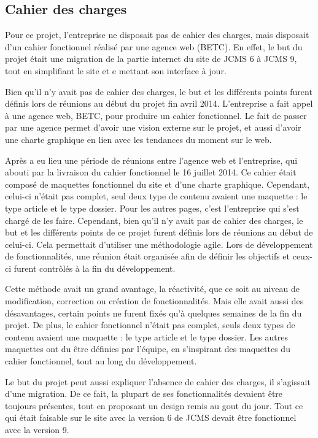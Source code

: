 \documentclass[12pt,a4paper]{article}
\begin{document}
\newpage
\subsection{Cahier des charges}
Pour ce projet, l'entreprise ne disposait pas de cahier des charges, mais disposait d'un cahier fonctionnel réalisé par une agence web (BETC). En effet, le but du projet était une migration de la partie internet du site de \gls{JCMS} 6 à \gls{JCMS} 9, tout en simplifiant le site et e mettant son interface à jour.\par
Bien qu'il n'y avait pas de cahier des charges, le but et les différents points furent définis lors de réunions au début du projet fin avril 2014. L'entreprise a fait appel à une agence web, BETC, pour produire un cahier fonctionnel. Le fait de passer par une agence permet d'avoir une vision externe sur le projet, et aussi d'avoir une charte graphique en lien avec les tendances du moment sur le web.\par 
Après a eu lieu une période de réunions entre l'agence web et l'entreprise, qui abouti par la livraison du cahier fonctionnel le 16 juillet 2014. Ce cahier était composé de maquettes fonctionnel du site et d'une charte graphique. Cependant, celui-ci n'était pas complet, seul deux type de contenu avaient une maquette : le type article et le type dossier. Pour les autres pages, c'est l'entreprise qui s'est chargé de les faire.
Cependant, bien qu'il n'y avait pas de cahier des charges, le but et les différents points de ce projet furent définis lors de réunions au début de celui-ci. Cela permettait d'utiliser une méthodologie agile. Lors de développement de fonctionnalités, une réunion était organisée afin de définir les objectifs et ceux-ci furent contrôlés à la fin du développement.\par 
Cette méthode avait un grand avantage, la réactivité, que ce soit au niveau de modification, correction ou création de fonctionnalités. Mais elle avait aussi des désavantages, certain points ne furent fixés qu'à quelques semaines de la fin du projet. De plus, le cahier fonctionnel n'était pas complet, seuls deux types de contenu avaient une maquette : le type article et le type dossier. Les autres maquettes ont du être définies par l'équipe, en s'inspirant des maquettes du cahier fonctionnel, tout au long du développement. \par 
Le but du projet peut aussi expliquer l'absence de cahier des charges, il s'agissait d'une migration. De ce fait, la plupart de ses fonctionnalités devaient être toujours présentes, tout en proposant un design remis au gout du jour. Tout ce qui était faisable sur le site avec la version 6 de \gls{JCMS} devait être fonctionnel avec la version 9.\par 
\end{document}
